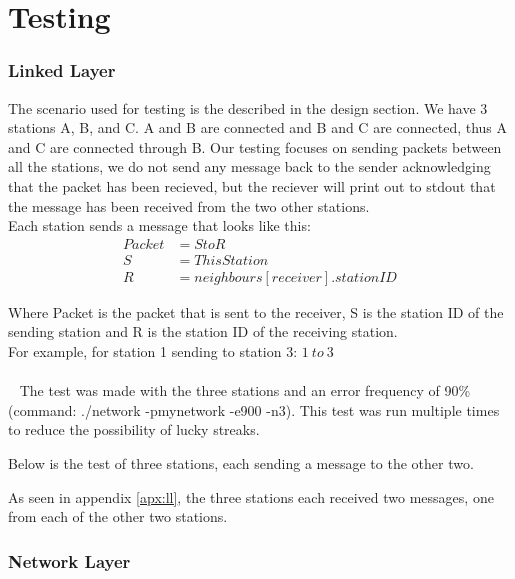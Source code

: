 \section{Testing}


\subsubsection{Linked Layer}
The scenario used for testing is the described in the design section.
We have 3 stations A, B, and C. A and B are connected and B and C are connected, thus A and C are connected through B. Our testing focuses on sending packets between all the stations, we do not send any message back to the sender acknowledging that the packet has been recieved, but the reciever will print out to stdout that the message has been received from the two other stations.\\

Each station sends a message that looks like this:
\begin{align*}
Packet &= S to R\\
S &= ThisStation\\
R &= neighbours[receiver].stationID
\end{align*}

Where Packet is the packet that is sent to the receiver, S is the station ID of the sending station and R is the station ID of the receiving station.\\
For example, for station 1 sending to station 3: $1\ to\ 3$\\
\\~
The test was made with the three stations and an error frequency of 90\% (command: ./network -pmynetwork -e900 -n3). This test was run multiple times to reduce the possibility of lucky streaks.

Below is the test of three stations, each sending a message to the other two.

As seen in appendix \ref{apx:ll}, the three stations each received two messages, one from each of the other two stations.



\subsubsection{Network Layer}

